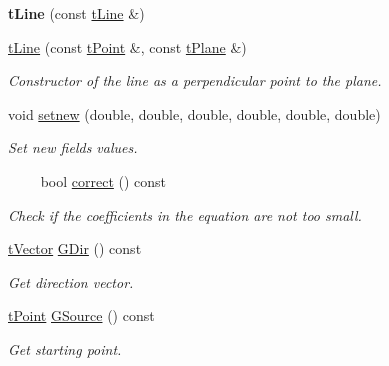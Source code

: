 \begin{DoxyCompactItemize}
\mbox{\label{classtLine_a2154dba6e6089dcbb6c3a61a10bb76c1}} 
{\bfseries t\+Line} (const \hyperlink{classtLine}{t\+Line} \&)
\item 
\mbox{\label{classtLine_a42c5470a9e40032639b6f22c82f90d9d}} 
\hyperlink{classtLine_a42c5470a9e40032639b6f22c82f90d9d}{t\+Line} (const \hyperlink{classtPoint}{t\+Point} \&, const \hyperlink{classtPlane}{t\+Plane} \&)
\begin{DoxyCompactList}\small\item\em Constructor of the line as a perpendicular point to the plane. \end{DoxyCompactList}\item 
\mbox{\label{classtLine_ad74c8cba60f8719f6cfaaf7bb86933bc}} 
void \hyperlink{classtLine_ad74c8cba60f8719f6cfaaf7bb86933bc}{setnew} (double, double, double, double, double, double)
\begin{DoxyCompactList}\small\item\em Set new fields values. \end{DoxyCompactList}\item 
     bool \hyperlink{classtLine_a11c37f0cbc668b30ebce655e7de4eb54}{correct} () const
\begin{DoxyCompactList}\small\item\em Check if the coefficients in the equation are not too small. \end{DoxyCompactList}\item 
\mbox{\label{classtLine_ae24e73371453cca328317f2512d9a53e}} 
\hyperlink{classtVector}{t\+Vector} \hyperlink{classtLine_ae24e73371453cca328317f2512d9a53e}{G\+Dir} () const
\begin{DoxyCompactList}\small\item\em Get direction vector. \end{DoxyCompactList}\item 
\mbox{\label{classtLine_aa2b2ab0dd465f2a824860b1f7211be1e}} 
\hyperlink{classtPoint}{t\+Point} \hyperlink{classtLine_aa2b2ab0dd465f2a824860b1f7211be1e}{G\+Source} () const
\begin{DoxyCompactList}\small\item\em Get starting point. \end{DoxyCompactList}\item 

\end{DoxyCompactItemize}
